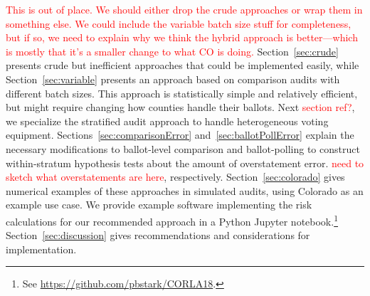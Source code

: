 \documentclass[runningheads]{llncs}
\newcommand{\comment}[1]{\textcolor{red}{\sc #1}}
\begin{document}
\comment{This is out of place. We should either drop the crude approaches or wrap them in something else.
We could include the variable batch size stuff for completeness, but if so, we need to explain why we think the hybrid approach is better---which is mostly that it's a smaller change to what CO is doing.}
Section~\ref{sec:crude} presents crude but inefficient approaches that could be implemented easily, while
Section~\ref{sec:variable} presents an approach based on comparison audits with different batch sizes.
This approach is statistically simple and relatively efficient, but might require changing how counties
handle their ballots.
Next \comment{section ref?}, we specialize the stratified audit approach to handle heterogeneous voting equipment.
Sections~\ref{sec:comparisonError} and~\ref{sec:ballotPollError} explain
the necessary modifications to ballot-level comparison and ballot-polling to construct within-stratum hypothesis tests about the amount of overstatement
error. \comment{need to sketch what overstatements are here}, respectively. 
Section~\ref{sec:colorado} gives numerical examples of these approaches in simulated audits,
using Colorado as an example use case.
We provide example software implementing the risk calculations for
our recommended approach in a Python Jupyter notebook.\footnote{%
 See \url{https://github.com/pbstark/CORLA18}.
}
Section~\ref{sec:discussion} gives recommendations and
considerations for implementation.
\end{document}
